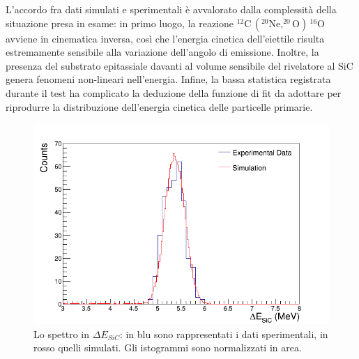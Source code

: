 L'accordo fra dati simulati e sperimentali è avvalorato dalla complessità della situazione presa in esame: in primo luogo, la reazione $^{12}\mbox{C}\,  ( ^{20}\mbox{Ne}, ^{20}\mbox{O} ) \, ^{16}\mbox{O} $ avviene in cinematica inversa, così che l'energia cinetica dell'eiettile risulta estremamente sensibile alla variazione dell'angolo di emissione.
Inoltre, la presenza del substrato epitassiale davanti al volume sensibile del rivelatore al SiC genera fenomeni non-lineari nell'energia.
Infine, la bassa statistica registrata durante il test ha complicato la deduzione della funzione di fit da adottare per riprodurre la distribuzione dell'energia cinetica delle particelle primarie.



\begin{figure} [!p]
	\centering
	\includegraphics[width=\textwidth, keepaspectratio]{Grafici_Tesi/Test/spettro_sic_normArea2.png}
	\caption{Lo spettro in $\Delta E_{SiC}$: in blu sono rappresentati i dati sperimentali, in rosso quelli simulati. Gli istogrammi sono normalizzati in area.} \label{fig:spettro_sic}
\end{figure}



